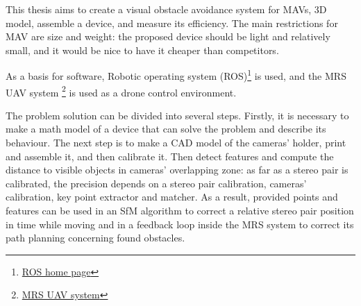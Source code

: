 This thesis aims to create a visual obstacle avoidance system for MAVs, 3D model, assemble a device, and measure its efficiency. 
The main restrictions for MAV are size and weight: the proposed device should be light and relatively small, and it would be nice to have it cheaper than competitors.

As a basis for software, Robotic operating system (ROS)\footnote{\href{https://www.ros.org/}{ROS home page}} is used, and the MRS UAV system \cite{Baca2021} \footnote{\href{https://github.com/ctu-mrs/mrs_uav_system}{MRS UAV system}} is used as a drone control environment.

The problem solution can be divided into several steps. 
Firstly, it is necessary to make a math model of a device that can solve the problem and describe its behaviour. 
The next step is to make a CAD model of the cameras' holder, print and assemble it, and then calibrate it. 
Then detect features and compute the distance to visible objects in cameras' overlapping zone: as far as a stereo pair is calibrated, the precision depends on a stereo pair calibration, cameras' calibration, key point extractor and matcher.
As a result, provided points and features can be used in an SfM algorithm to correct a relative stereo pair position in time while moving and in a feedback loop inside the MRS system to correct its path planning concerning found obstacles.
